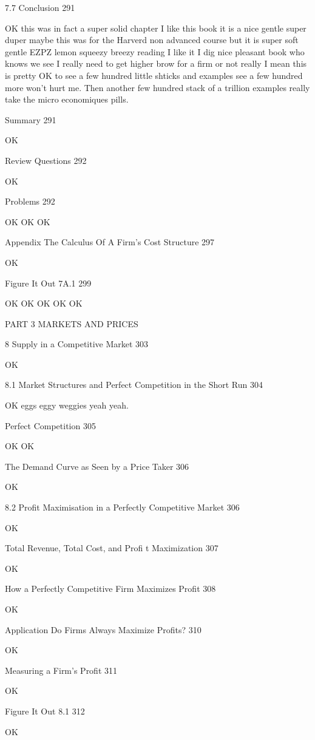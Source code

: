 7.7 Conclusion 291

OK this was in fact a super solid chapter I like this book it is a nice gentle super duper maybe this was for the Harverd non advanced course but it is super soft gentle EZPZ lemon squeezy breezy reading I like it I dig nice pleasant book who knows we see I really need to get higher brow for a firm or not really I mean this is pretty OK to see a few hundred little shticks and examples see a few hundred more won't hurt me. Then another few hundred stack of a trillion examples really take the micro economiques pills.

Summary 291

OK

Review Questions 292

OK

Problems 292

OK OK OK

Appendix The Calculus Of A Firm's Cost Structure 297

OK

Figure It Out 7A.1 299

OK OK OK OK OK

PART 3 MARKETS AND PRICES



8 Supply in a Competitive Market 303

OK

8.1 Market Structures and Perfect Competition in the Short Run 304

OK eggs eggy weggies yeah yeah.

Perfect Competition 305

OK OK

The Demand Curve as Seen by a Price Taker 306

OK

8.2 Profit Maximisation in a Perfectly Competitive Market 306

OK

Total Revenue, Total Cost, and Profi t Maximization 307

OK

How a Perfectly Competitive Firm Maximizes Profit 308

OK

Application Do Firms Always Maximize Profits? 310

OK

Measuring a Firm's Profit 311

OK

Figure It Out 8.1 312

OK

